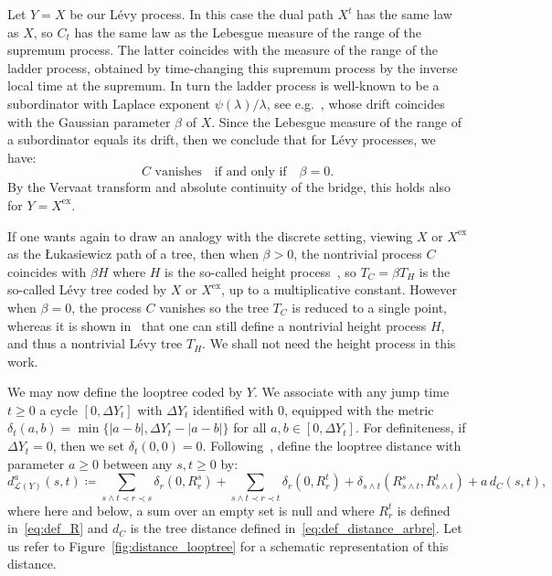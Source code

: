 \documentclass[british, a4paper,11pt]{article}
\numberwithin{equation}{section}
\theoremstyle{definition}
\newcommand{\Loop}{\mathscr{L}}
\newcommand{\exc}{\mathrm{ex}}
\begin{document}
Let $Y=X$ be our L\'evy process. In this case the dual path $X^t$ has the same law as $X$, so $C_t$ has the same law as the Lebesgue measure of the range of the supremum process. The latter coincides with the measure of the range of the ladder process, obtained by time-changing this supremum process by the inverse local time at the supremum. In turn the ladder process is well-known to be a subordinator with Laplace exponent $\psi(\lambda)/\lambda$, see e.g.~\cite[Lemma~1.1.2]{DLG02}, whose drift coincides with the Gaussian parameter $\beta$ of $X$. Since the Lebesgue measure of the range of a subordinator equals its drift, then we conclude that for L\'evy processes, we have:
\[C \text{ vanishes} \quad\text{if and only if}\quad \beta = 0.\]
By the Vervaat transform and absolute continuity of the bridge, this holds also for $Y=X^{\exc}$.

If one wants again to draw an analogy with the discrete setting, viewing $X$ or $X^{\exc}$ as the {\L}ukasiewicz path of a tree, then when $\beta>0$, the nontrivial process $C$ coincides with $\beta H$ where $H$ is the so-called height process~\cite[Equation~14]{DLG02}, so $T_C = \beta T_H$ is the so-called L\'evy tree coded by $X$ or $X^{\exc}$, up to a multiplicative constant.
However when $\beta=0$, the process $C$ vanishes so the tree $T_C$ is reduced to a single point, whereas it is shown in~\cite{DLG02} that one can still define a nontrivial height process $H$, and thus a nontrivial L\'evy tree $T_H$.
We shall not need the height process in this work.

We may now define the looptree coded by $Y$.
We associate with any jump time $t \geq 0$ a cycle $[0, \Delta Y_t]$ with $\Delta Y_t$ identified with $0$, equipped with the metric $\delta_t(a,b) = \min\{|a-b|, \Delta Y_t - |a-b|\}$ for all $a,b \in [0, \Delta Y_t]$. For definiteness, if $\Delta Y_t = 0$, then we set $\delta_t(0,0) = 0$. 
Following~\cite{Mar24}, define the looptree distance with parameter $a\ge0$ between any $s, t \geq 0$ by:
\begin{equation}\label{eq:def_distance_looptree}
d^a_{\Loop(Y)}(s,t) \coloneqq \sum_{s \wedge t \prec r \prec s} \delta_r(0, R^s_r) + \sum_{s \wedge t \prec r \prec t} \delta_r(0, R^t_r) + \delta_{s \wedge t}(R^s_{s \wedge t}, R^t_{s \wedge t}) + a\, d_C(s,t),
\end{equation}
where here and below, a sum over an empty set is null and where $R^t_r$ is defined in~\eqref{eq:def_R} and $d_C$ is the tree distance defined in~\eqref{eq:def_distance_arbre}.
Let us refer to Figure~\ref{fig:distance_looptree} for a schematic representation of this distance.
\end{document}
